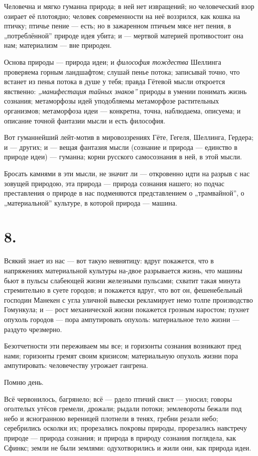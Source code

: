 \documentclass[12pt,a4paper,oneside]{book}
\begin{document}
Человечна и мягко гуманна природа; в ней нет извращений; но человеческий взор озирает её плотоядно; человек современности на неё воззрился, как кошка на птичку; птичье пение — есть; но в зажаренном птичьем мясе нет пения, в „потреблённой” природе идея убита; и — мертвой материей противостоит она нам; материализм — вне природен.

Основа природы — природа идеи; и \emph{философия тождества} Шеллинга проверяема горным ландшафтом; слушай пенье потока; записывай точно, что встанет из пенья потока в душе у тебя; правда Гётевой мысли откроется явственно: \emph{„манифестация тайных знаков”} природы в умении понимать жизнь сознания; метаморфозы идей уподобляемы метаморфозе растительных организмов; метаморфоза идеи — конкретна, точна, наблюдаема, описуема; и описание точной фантазии мысли и есть философия.

Вот гуманнейший лейт-мотив в мировоззрениях Гёте, Гегеля, Шеллинга, Гердера; и — других; и — вещая фантазия мысли (сознание и природа — единство в природе идеи) — гуманна; корни русского самосознания в ней, в этой мысли.

Бросать камнями в эти мысли, не значит ли — откровенно идти на разрыв с нас зовущей природою, эта природа — природа сознания нашего; но подчас преставления о природе в нас подменяются представлением о „трамвайной”, о „материальной” культуре, в которой природа — машина.

\section*{8.}

Всякий знает из нас — вот такую невнятицу: вдруг покажется, что в напряжениях материальной культуры на-двое разрывается жизнь, что машины бьют в пульсы слабеющей жизни железными пульсами; схватит такая минута стремительно в суете городов; и покажется вдруг, что вот он, фешенебельный господин Манекен с угла уличной вывески рекламирует немо толпе производство Гомункула; и — рост механической жизни покажется грозным наростом; пухнет опухоль городов — пора ампутировать опухоль: материальное тело жизни — раздуто чрезмерно.

Безотчетности эти переживаем мы все; и горизонты сознания возникают пред нами; горизонты гремят своим кризисом; материальную опухоль жизни пора ампутировать: человечеству угрожает гангрена.

Помню день.

Всё червонилось, багрянело; всё — рдело птичий свист — уносил; говоры оголтелых утёсов гремели, дрожали; рыдали потоки; землевороты бежали под небо и ясногранною вереницей плотнели в тенях, гребни резали небо; серебрились осколки их; прорезались покровы природы, прорезались навстречу природе — природа сознания; и природа в природу сознания поглядела, как Сфинкс; земли не были землями: одухотворились и жили они, как природа идеи.
\end{document}
